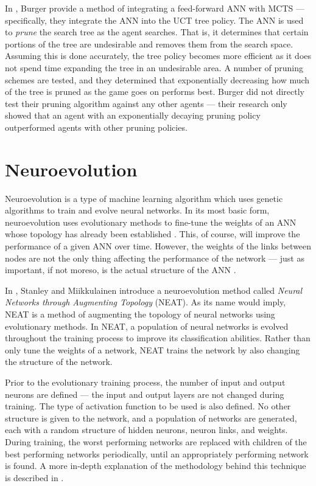 In \cite{annpruning}, Burger \etal provide a method of integrating a feed-forward ANN with MCTS --- specifically, they integrate the ANN into the UCT tree policy.  The ANN is used to \textit{prune} the search tree as the agent searches.  That is, it determines that certain portions of the tree are undesirable and removes them from the search space.  Assuming this is done accurately, the tree policy becomes more efficient as it does not spend time expanding the tree in an undesirable area.  A number of pruning schemes are tested, and they determined that exponentially decreasing how much of the tree is pruned as the game goes on performs best.  Burger \etal did not directly test their pruning algorithm against any other agents --- their research only showed that an agent with an exponentially decaying pruning policy outperformed agents with other pruning policies.  

\section{Neuroevolution}
Neuroevolution is a type of machine learning algorithm which uses genetic algorithms to train and evolve neural networks.  In its most basic form, neuroevolution uses evolutionary methods to fine-tune the weights of an ANN whose topology has already been established \cite{aimodern}.  This, of course, will improve the performance of a given ANN over time.  However, the weights of the links between nodes are not the only thing affecting the performance of the network --- just as important, if not moreso, is the actual structure of the ANN \cite{NEAT}.

In \cite{NEAT}, Stanley and Miikkulainen introduce a neuroevolution method called \textit{Neural Networks through Augmenting Topology} (NEAT).  As its name would imply, NEAT is a method of augmenting the topology of neural networks using evolutionary methods.  In NEAT, a population of neural networks is evolved throughout the training process to improve its classification abilities.  Rather than only tune the weights of a network, NEAT trains the network by also changing the structure of the network.

Prior to the evolutionary training process, the number of input and output neurons are defined --- the input and output layers are not changed during training.  The type of activation function to be used is also defined.  No other structure is given to the network, and a population of networks are generated, each with a random structure of hidden neurons, neuron links, and weights.  During training, the worst performing networks are replaced with children of the best performing networks periodically, until an appropriately performing network is found.  A more in-depth explanation of the methodology behind this technique is described in \cite{NEAT}.

